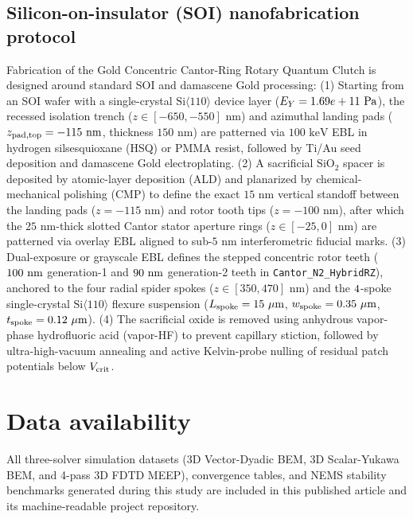 \documentclass[11pt,letterpaper]{article}
\begin{document}
\subsection*{Silicon-on-insulator (SOI) nanofabrication protocol}
Fabrication of the Gold Concentric Cantor-Ring Rotary Quantum Clutch is designed around standard SOI and damascene Gold processing: (1) Starting from an SOI wafer with a single-crystal $\text{Si}\langle 110\rangle$ device layer ($E_Y = 1.69e+11{}\text{ Pa}$), the recessed isolation trench ($z \in [-650, -550]\text{ nm}$) and azimuthal landing pads ($z_{\rm pad,top} = -115\text{ nm}$, thickness $150\text{ nm}$) are patterned via $100\text{ keV}$ EBL in hydrogen silsesquioxane (HSQ) or PMMA resist, followed by Ti/Au seed deposition and damascene Gold electroplating. (2) A sacrificial $\text{SiO}_2$ spacer is deposited by atomic-layer deposition (ALD) and planarized by chemical-mechanical polishing (CMP) to define the exact $15\text{ nm}$ vertical standoff between the landing pads ($z = -115\text{ nm}$) and rotor tooth tips ($z = -100\text{ nm}$), after which the $25\text{ nm}$-thick slotted Cantor stator aperture rings ($z \in [-25, 0]\text{ nm}$) are patterned via overlay EBL aligned to sub-$5\text{ nm}$ interferometric fiducial marks. (3) Dual-exposure or grayscale EBL defines the stepped concentric rotor teeth ($100{}\text{ nm}$ generation-1 and $90{}\text{ nm}$ generation-2 teeth in \texttt{Cantor\_N2\_HybridRZ}), anchored to the four radial spider spokes ($z \in [350, 470]\text{ nm}$) and the $4{}$-spoke single-crystal $\text{Si}\langle 110\rangle$ flexure suspension ($L_{\rm spoke} = \NatureRotCeightCompactNtwoLateralStabilityLSpokeUm{}\ \mu\text{m}$, $w_{\rm spoke} = \NatureRotCeightCompactNtwoLateralStabilityWSpokeUm{}\ \mu\text{m}$, $t_{\rm spoke} = \NatureRotCeightCompactNtwoLateralStabilityTSpokeUm{}\ \mu\text{m}$). (4) The sacrificial oxide is removed using anhydrous vapor-phase hydrofluoric acid (vapor-HF) to prevent capillary stiction, followed by ultra-high-vacuum annealing and active Kelvin-probe nulling of residual patch potentials below $V_{\rm crit}$.

\section*{Data availability}
All three-solver simulation datasets (3D Vector-Dyadic BEM, 3D Scalar-Yukawa BEM, and 4-pass 3D FDTD MEEP), convergence tables, and NEMS stability benchmarks generated during this study are included in this published article and its machine-readable project repository.
\end{document}
